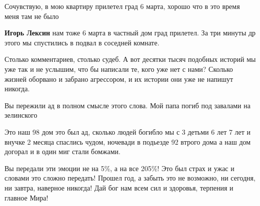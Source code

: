 
Сочувствую, в мою квартиру прилетел град 6 марта, хорошо что в это время меня там не было

\begin{itemize} %
\textbf{Игорь Лексин} нам тоже 6 марта в частный дом град прилетел. За три минуты др этого мы спустились в подвал в соседней комнате.
\end{itemize} %


Столько комментариев, столько судеб. А вот десятки тысяч подобных историй мы
уже так и не услышим, что бы написали те, кого уже нет с нами? Сколько жизней
оборвано и забрано агрессором, и их истории они уже не напишут никогда.


Вы пережили ад в полном смысле этого слова. Мой папа погиб под завалами на зелинского


Это наш 98 дом это был ад, сколько людей богибло мы с 3 детьми 6 лет 7 лет и
внучке 2 месяца спаслись чудом, ночевади в подьезде 92 втрого дома а наш дом
догорал и в один миг стали бомжами.


Вы передали эти эмоции не на 5\%, а на все 205\%! Это был страх и ужас и словами
это сложно передать! Прошел год, а забыть это не возможно, ни сегодня, ни
завтра, наверное никогда! Дай бог нам всем сил и здоровья, терпения и главное
Мира!
